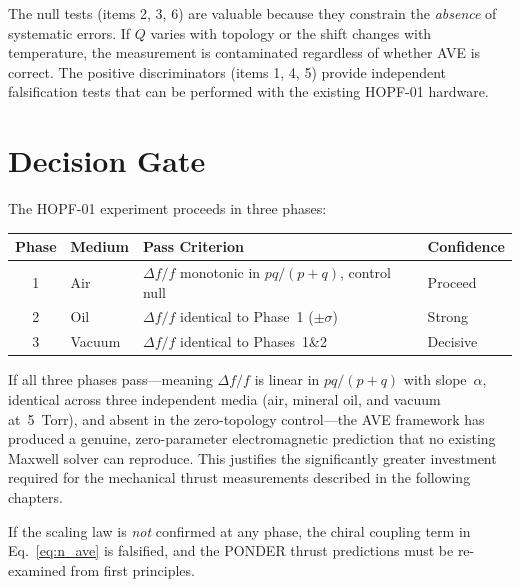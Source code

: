\noindent The null tests (items 2, 3, 6) are valuable because they constrain the \textit{absence} of systematic errors. If $Q$ varies with topology or the shift changes with temperature, the measurement is contaminated regardless of whether AVE is correct. The positive discriminators (items 1, 4, 5) provide independent falsification tests that can be performed with the existing HOPF-01 hardware.

\section{Decision Gate}

The HOPF-01 experiment proceeds in three phases:

\begin{center}
\begin{tabular}{|c|l|l|l|}
\hline
Phase & Medium & Pass Criterion & Confidence \\ \hline
1 & Air     & $\Delta f/f$ monotonic in $pq/(p{+}q)$, control null & Proceed \\
2 & Oil     & $\Delta f/f$ identical to Phase~1 ($\pm\sigma$)       & Strong  \\
3 & Vacuum  & $\Delta f/f$ identical to Phases~1\&2                  & Decisive \\ \hline
\end{tabular}
\end{center}

\noindent If all three phases pass---meaning $\Delta f/f$ is linear in $pq/(p+q)$ with slope~$\alpha$, identical across three independent media (air, mineral oil, and vacuum at~5~Torr), and absent in the zero-topology control---the AVE framework has produced a genuine, zero-parameter electromagnetic prediction that no existing Maxwell solver can reproduce. This justifies the significantly greater investment required for the mechanical thrust measurements described in the following chapters.

If the scaling law is \textit{not} confirmed at any phase, the chiral coupling term in Eq.~\ref{eq:n_ave} is falsified, and the PONDER thrust predictions must be re-examined from first principles.
